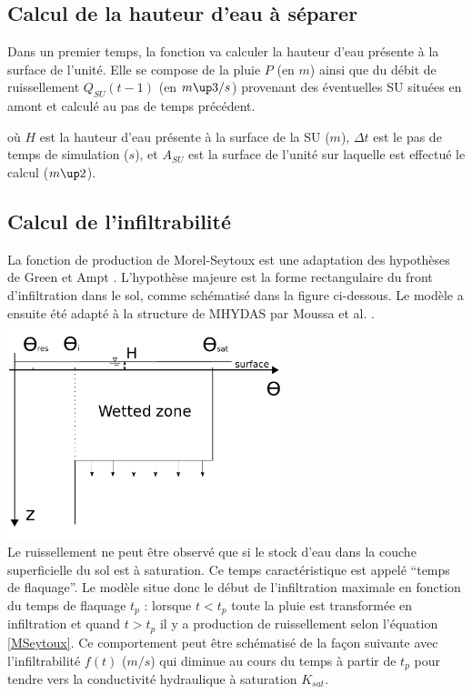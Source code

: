 \subsection{Calcul de la hauteur d'eau à séparer}
Dans un premier temps, la fonction va calculer la hauteur d'eau présente à la surface de l'unité. Elle se compose de la pluie $P$ (en $m$) ainsi que du débit de ruissellement $Q_{SU}(t-1)$ (en $m\up3/s$) provenant des éventuelles SU situées en amont et calculé au pas de temps précédent.



où $H$ est la hauteur d'eau présente à la surface de la SU ($m$), $\Delta t$ est le pas de temps de simulation ($s$), et $A_{SU}$ est la surface de l'unité sur laquelle est effectué le calcul ($m\up2$).


\subsection{Calcul de l'infiltrabilité}
La fonction de production de Morel-Seytoux \cite{MorelS1978} est une adaptation des hypothèses de Green et Ampt \cite{Green1911}. L'hypothèse majeure est la forme rectangulaire du front d'infiltration dans le sol, comme schématisé dans la figure ci-dessous. Le modèle a ensuite été adapté à la structure de MHYDAS par Moussa et al. \cite{Moussa2002}.\\

\includegraphics[width=8cm]{common/Green_Ampt_humidity.pdf}\\

Le ruissellement ne peut être observé que si le stock d'eau dans la couche superficielle du sol est à saturation. Ce temps caractéristique est appelé ``temps de flaquage''. Le modèle situe donc le début de l’infiltration maximale en fonction du temps de flaquage $t_p$ : lorsque $t < t_p$ toute la pluie est transformée en infiltration et quand $t > t_p$ il y a production de ruissellement selon l'équation \ref{MSeytoux}. Ce comportement peut être schématisé de la façon suivante avec l'infiltrabilité $f(t)$ ($m/s$) qui diminue au cours du temps à partir de $t_p$ pour tendre vers la conductivité hydraulique à saturation $K_{sat}$.\\

